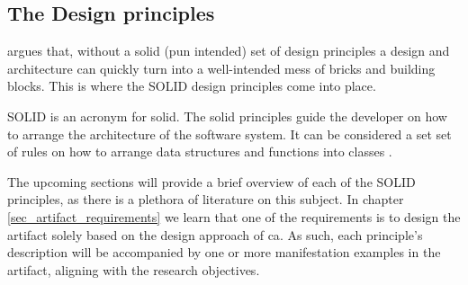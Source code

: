 \subsection{The Design principles} \label{subsec_design_principles}

 argues that, without a solid (pun intended) set of
design principles a design and architecture can quickly turn into a well-intended mess
of bricks and building blocks. This is where the SOLID design principles come into place.

SOLID is an acronym for \gls{solid}. The \gls{solid} principles guide the developer on how
to arrange the architecture of the software system. It can be considered a set set of
rules on how to arrange data structures and functions into classes
\parencite[78]{robert_c_martin_clean_2018}.

The upcoming sections will provide a brief overview of each of the SOLID principles, as
there is a plethora of literature on this subject. In chapter
\ref{sec_artifact_requirements} we learn that one of the requirements is to design the
artifact solely based on the design approach of \gls{ca}. As such, each principle's description
will be accompanied by one or more manifestation examples in the artifact, aligning with
the research objectives.